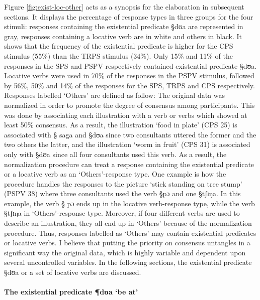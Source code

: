 Figure \ref{fig:exist-loc-other} acts as a  synopsis for  the elaboration in 
subsequent sections. It  displays the percentage of response types
in three groups for the four stimuli:  responses containing the existential
predicate {\S dʊa} are represented in gray, responses containing a locative
verb
 are in white and others in black.  It shows that
the  frequency of the  existential  predicate  is higher for the CPS stimulus
(55\%) than the  TRPS stimulus (34\%).  Only 15\% and 11\% of the responses in
the
SPS and PSPV respectively contained
existential predicate {\S dʊa}. Locative verbs were used in 70\% of the
responses in the PSPV stimulus, followed by  56\%, 50\% and 14\% of the
responses for the SPS, TRPS and CPS respectively. Responses labelled `Others'
are defined as follow: The original data was normalized  in order to promote the
degree  of consensus among participants. This was done by associating each
illustration with a verb or verbs which showed at least 50\% consensus. As a
result,   the illustration `food in plate' (CPS 25) is associated with {\S
saga}
and {\S dʊa} since  two consultants uttered the former and the two others the
latter,  and the illustration `worm in fruit' (CPS 31) is associated only with
{\S dʊa} since  all four consultants used this verb. As a result, the
normalization procedure can treat a response
containing the existential predicate or a locative verb as an `Others'-response
type.   One example is
how the procedure handles the
responses to the picture `stick standing on tree stump' (PSPV 38) where three
consultants used the verb {\S pɔ} and one {\S tʃɪŋa}. In this example,  the verb
{\S
pɔ} ends up
in the locative verb-response type, while  the verb {\S tʃɪŋa} in
 `Others'-response
type.  Moreover, if four different verbs are used to describe an
illustration, they all
end up in `Others' because of the normalization procedure.   Thus,
responses labelled as `Others' may contain existential  predicates or locative
verbs. I believe that putting the priority on consensus untangles in a
significant way the original data, which is highly variable and dependent upon
several uncontrolled variables. In the following sections,  the existential
predicate {\S dʊa} or a set of  locative verbs are discussed.



\paragraph{The existential predicate {\P dʊa} `be at'}
\label{sec:SPA-Type-II}

